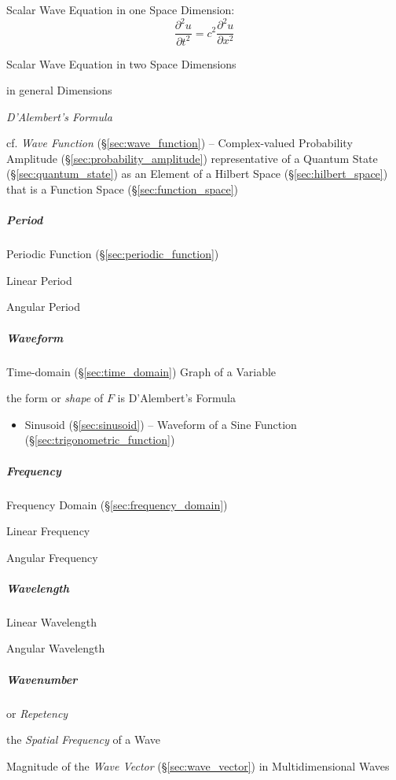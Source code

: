 Scalar Wave Equation in one Space Dimension:
\[
  \frac{\partial^2 u}{\partial{t}^2} = c^2 \frac{\partial^2 u}{\partial{x}^2}
\]

Scalar Wave Equation in two Space Dimensions

in general Dimensions

\emph{D'Alembert's Formula}

cf. \emph{Wave Function} (\S\ref{sec:wave_function}) -- Complex-valued
Probability Amplitude (\S\ref{sec:probability_amplitude}) representative of a
Quantum State (\S\ref{sec:quantum_state}) as an Element of a Hilbert Space
(\S\ref{sec:hilbert_space}) that is a Function Space
(\S\ref{sec:function_space})



\subparagraph{Period}\label{sec:period}\hfill

\fist Periodic Function (\S\ref{sec:periodic_function})

Linear Period

Angular Period



\subparagraph{Waveform}\label{sec:waveform}\hfill

Time-domain (\S\ref{sec:time_domain}) Graph of a Variable

the form or \emph{shape} of $F$ is D'Alembert's Formula

\begin{itemize}
  \item Sinusoid (\S\ref{sec:sinusoid}) -- Waveform of a Sine Function
    (\S\ref{sec:trigonometric_function})
\end{itemize}



\subparagraph{Frequency}\label{sec:frequency}\hfill

\fist Frequency Domain (\S\ref{sec:frequency_domain})

Linear Frequency

Angular Frequency



\subparagraph{Wavelength}\label{sec:wavenumber}\hfill

Linear Wavelength

Angular Wavelength



\subparagraph{Wavenumber}\label{sec:wavenumber}\hfill

or \emph{Repetency}

the \emph{Spatial Frequency} of a Wave

Magnitude of the \emph{Wave Vector} (\S\ref{sec:wave_vector}) in
Multidimensional Waves


